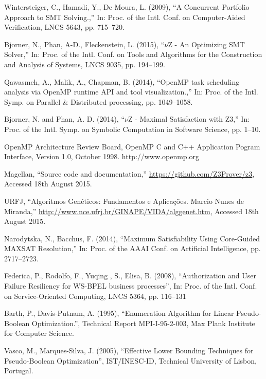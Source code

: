 \begin{thebibliography}{5}
Wintersteiger, C., Hamadi, Y., De Moura, L. (2009), ``{A Concurrent Portfolio Approach to SMT Solving.},'' In: Proc. of the Intl. Conf. on Computer-Aided Verification, LNCS 5643, pp. 715--720.

Bjorner, N., Phan, A-D., Fleckenstein, L. (2015), ``{$\nu$Z - An Optimizing SMT Solver},'' In: Proc. of the Intl. Conf. on Tools and Algorithms for the Construction and Analysis of Systems, LNCS 9035, pp. 194--199.

Qawasmeh, A., Malik, A., Chapman, B. (2014), ``{OpenMP task scheduling analysis via OpenMP runtime API and tool visualization.},'' In: Proc. of the Intl. Symp. on Parallel \& Distributed processing, pp. 1049--1058.

Bjorner, N. and Phan, A. D. (2014), ``{$\nu$Z - Maximal Satisfaction with Z3},'' In: Proc. of the Intl. Symp. on Symbolic Computation in Software Science, pp. 1--10.

OpenMP Architecture Review Board, OpenMP C and C++
Application Pogram Interface, Version 1.0, October 1998.
http://www.openmp.org

Magellan, ``{Source code and documentation},''
  \url{https://github.com/Z3Prover/z3}, Accessed 18th August 2015.
  
URFJ, ``{Algoritmos Genéticos: Fundamentos e Aplicações. Marcio Nunes de Miranda},''
  \url{http://www.nce.ufrj.br/GINAPE/VIDA/alggenet.htm}, Accessed 18th August 2015.

Narodytska, N., Bacchus, F. (2014), {``Maximum Satisfiability Using Core-Guided MAXSAT Resolution},'' In: Proc. of the AAAI Conf. on Artificial Intelligence, pp. 2717--2723.

Federica, P., Rodolfo, F., Yuqing , S., Elisa, B. (2008), {``Authorization and User Failure Resiliency for WS-BPEL business processes''}, In: Proc. of the Intl. Conf. on Service-Oriented Computing, LNCS 5364, pp. 116--131

Barth, P., Davis-Putnam, A. (1995), {``Enumeration Algorithm for Linear
Pseudo-Boolean Optimization.''}, Technical Report MPI-I-95-2-003, Max Plank Institute for Computer Science.

Vasco, M., Marques-Silva, J. (2005), {``Effective Lower Bounding Techniques for Pseudo-Boolean Optimization''}, IST/INESC-ID, Technical University of Lisbon, Portugal.


\end{thebibliography}
